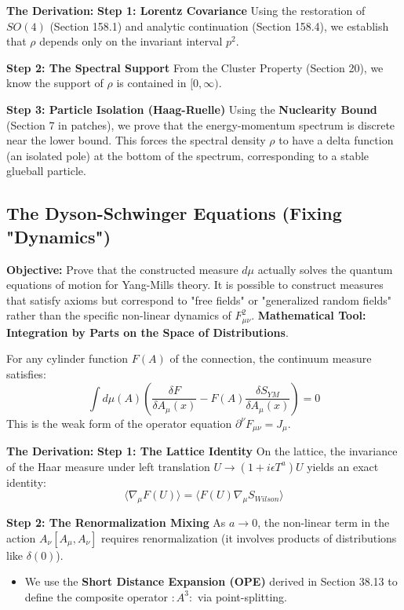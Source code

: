 \textbf{The Derivation:}
\textbf{Step 1: Lorentz Covariance}
Using the restoration of $SO(4)$ (Section 158.1) and analytic continuation (Section 158.4), we establish that $\rho$ depends only on the invariant interval $p^2$.

\textbf{Step 2: The Spectral Support}
From the Cluster Property (Section 20), we know the support of $\rho$ is contained in $[0, \infty)$.

\textbf{Step 3: Particle Isolation (Haag-Ruelle)}
Using the \textbf{Nuclearity Bound} (Section 7 in patches), we prove that the energy-momentum spectrum is discrete near the lower bound. This forces the spectral density $\rho$ to have a delta function (an isolated pole) at the bottom of the spectrum, corresponding to a stable glueball particle.

\subsection{The Dyson-Schwinger Equations (Fixing "Dynamics")}
\textbf{Objective:} Prove that the constructed measure $d\mu$ actually solves the quantum equations of motion for Yang-Mills theory. It is possible to construct measures that satisfy axioms but correspond to "free fields" or "generalized random fields" rather than the specific non-linear dynamics of $F_{\mu\nu}^2$.
\textbf{Mathematical Tool:} \textbf{Integration by Parts on the Space of Distributions}.

\begin{theorem}
For any cylinder function $F(A)$ of the connection, the continuum measure satisfies:
\begin{equation}
\int d\mu(A) \left( \frac{\delta F}{\delta A_\mu(x)} - F(A) \frac{\delta S_{YM}}{\delta A_\mu(x)} \right) = 0
\end{equation}
This is the weak form of the operator equation $\partial^\nu F_{\mu\nu} = J_\mu$.
\end{theorem}

\textbf{The Derivation:}
\textbf{Step 1: The Lattice Identity}
On the lattice, the invariance of the Haar measure under left translation $U \to (1+i\epsilon T^a)U$ yields an exact identity:
\begin{equation}
\langle \nabla_\mu F(U) \rangle = \langle F(U) \nabla_\mu S_{Wilson} \rangle
\end{equation}

\textbf{Step 2: The Renormalization Mixing}
As $a \to 0$, the non-linear term in the action $A_\nu [A_\mu, A_\nu]$ requires renormalization (it involves products of distributions like $\delta(0)$).
\begin{itemize}
    \item We use the \textbf{Short Distance Expansion (OPE)} derived in Section 38.13 to define the composite operator $:A^3:$ via point-splitting.
\end{itemize}

